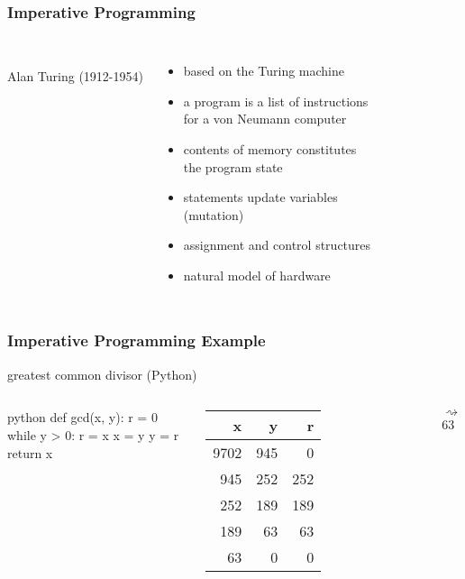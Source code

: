 \documentclass[dvipsnames]{beamer}
\theoremstyle{plain}
\begin{document}
\begin{frame}
  \frametitle{Imperative Programming}

  \begin{columns}
    \begin{center}
      \\
      Alan Turing (1912-1954)
    \end{center}

    \begin{itemize}
      \item based on the Turing machine
      \item a program is a list of instructions\\
        for a von Neumann computer
      \item contents of memory constitutes\\
        the program \alert{state}

      \pause
      \medskip
      \item statements update variables\\
        (\alert{mutation})
      \item assignment and control structures
      \item natural model of hardware
    \end{itemize}
  \end{columns}
\end{frame}

\begin{frame}[fragile]
  \frametitle{Imperative Programming Example}

  \begin{exampleblock}{greatest common divisor (Python)}
    \begin{columns}
      \begin{pygments}{python}
def gcd(x, y):
    r = 0
    while y > 0:
        r = x %
        x = y
        y = r
    return x
      \end{pygments}

      \begin{tabular}{|r|r|r|}\hline
   x &   y &   r\\\hline\hline
9702 & 945 &   0\\\hline
 945 & 252 & 252\\\hline
 252 & 189 & 189\\\hline
 189 &  63 &  63\\\hline
  63 &   0 &   0\\\hline
      \end{tabular}

      \medskip
      $\rightsquigarrow$ 63
    \end{columns}
  \end{exampleblock}
\end{frame}
\end{document}
